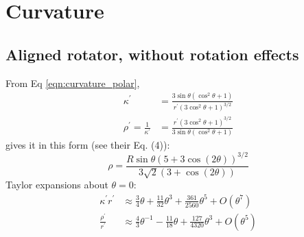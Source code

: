 \documentclass{book}
\begin{document}
\section{Curvature}

\subsection{Aligned rotator, without rotation effects}
From Eq \eqref{eqn:curvature_polar},
\begin{equation}
    \begin{aligned}
        \kappa^\prime &= \frac{3\sin\theta(\cos^2\theta + 1)}{r^\prime(3\cos^2\theta + 1)^{3/2}} \\
        \rho^\prime = \frac{1}{\kappa^\prime}
            &= \frac{r^\prime(3\cos^2\theta + 1)^{3/2}}{3\sin\theta(\cos^2\theta + 1)}
    \end{aligned}
\end{equation}
\citet{Gangadhara2004} gives it in this form (see their Eq. (4)):
\begin{equation}
    \rho = \frac{R\sin\theta(5 + 3\cos(2\theta))^{3/2}}{3\sqrt{2}(3 + \cos(2\theta))}
\end{equation}
Taylor expansions about $\theta = 0$:
\begin{equation}
    \begin{aligned}
        \kappa^\prime r^\prime &\approx \frac34 \theta + \frac{11}{32} \theta^3 + \frac{361}{2560} \theta^5 + O(\theta^7) \\
        \frac{\rho^\prime}{r^\prime} &\approx \frac43 \theta^{-1} - \frac{11}{18}\theta + \frac{127}{4320}\theta^3 + O(\theta^5)
    \end{aligned}
\end{equation}
\end{document}
